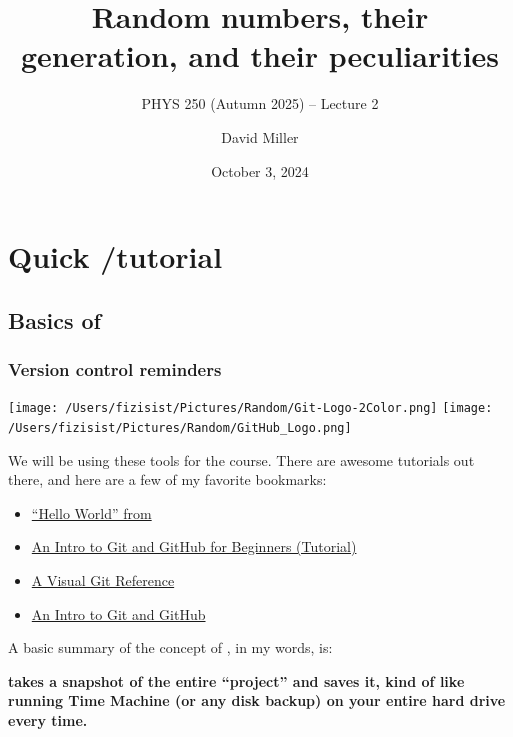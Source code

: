 \documentclass[hyperref={colorlinks=true}]{beamer}
\title[PHYS 250 (Autumn 2025) TODAY -- Lecture 1]{Random numbers, their generation, and their peculiarities}
\subtitle{PHYS 250 (Autumn 2025) -- Lecture 2}
\author[D.W.~Miller]{David Miller}
\institute[EFI, Chicago] 
{
  Department of Physics and the Enrico Fermi Institute\\
  University of Chicago
}
\date[October 3, 2024]{October 3, 2024}
\begin{document}

{
\begin{frame}
  \titlepage
\end{frame}
}

\section[Quick \git/\github tutorial]{Quick \git/\github tutorial}

\subsection[Basics of \git]{Basics of \git}

\begin{frame}%
  \frametitle{Version control reminders}
  
  \begin{center}
    \texttt{[image: /Users/fizisist/Pictures/Random/Git-Logo-2Color.png]}
    \texttt{[image: /Users/fizisist/Pictures/Random/GitHub\_Logo.png]}
  \end{center}

  We will be using these tools for the course. There are  awesome tutorials out there, and here are a few of my favorite bookmarks:
  
  \begin{itemize}
    \item \href{https://guides.github.com/activities/hello-world/}{``Hello World'' from \github}
    \item \href{https://product.hubspot.com/blog/git-and-github-tutorial-for-beginners}{An Intro to Git and GitHub for Beginners (Tutorial)}
    \item \href{http://marklodato.github.io/visual-git-guide/index-en.html}{A Visual Git Reference}
    \item \href{https://medium.com/@abhishekj/an-intro-to-git-and-github-1a0e2c7e3a2f}{An Intro to Git and GitHub}
  \end{itemize}

  A basic summary of the concept of \git, in my words, is:
  
  \begin{ucblock}{}
    \centering \textbf{\git takes a snapshot of the entire ``project'' and saves it, kind of like running Time Machine (or any disk backup) on your entire hard drive every time.}
  \end{ucblock}


\end{frame}
\end{document}
